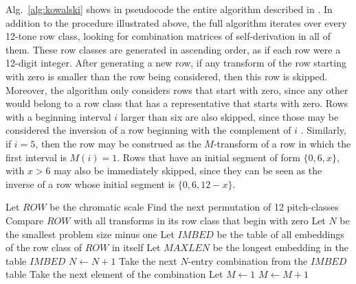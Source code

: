 Alg.~\ref{alg:kowalski} shows in pseudocode the entire algorithm described in \cite{Kowalski1987b}. In addition to the procedure illustrated above, the full algorithm iterates over every 12-tone row class, looking for combination matrices of self-derivation in all of them. These row classes are generated in ascending order, as if each row were a 12-digit integer. After generating a new row, if any transform of the row starting with zero is smaller than the row being considered, then this row is skipped. Moreover, the algorithm only considers rows that start with zero, since any other would belong to a row class that has a representative that starts with zero. Rows with a beginning interval $i$ larger than six are also skipped, since those may be considered the inversion of a row beginning with the complement of $i$ \cite[34]{Kowalski1987b}. Similarly, if $i = 5$, then the row may be construed as the $M$-transform of a row in which the first interval is $M(i) = 1$. Rows that have an initial segment of form $\{0, 6, x\}$, with $x > 6$ may also be immediately skipped, since they can be seen as the inverse of a row whose initial segment is $\{0, 6, 12 - x\}$.

\begin{algorithm2e}
\caption{\cite[35, 36, 37]{Kowalski1987b}}
\label{alg:kowalski}
\DontPrintSemicolon
{}
Let $ROW$ be the chromatic scale\;
Find the next permutation of 12 pitch-classes\;
Compare $ROW$ with all transforms in its row class that begin with zero\;
Let $N$ be the smallest problem size minus one\;
Let $IMBED$ be the table of all embeddings of the row class of $ROW$ in itself\;
Let $MAXLEN$ be the longest embedding in the table $IMBED$\;
$N \gets N + 1$\;
Take the next $N$-entry combination from the $IMBED$ table\;
Take the next element of the combination\;
Let $M \gets 1$\;
$M \gets M + 1$\;
\end{algorithm2e}

